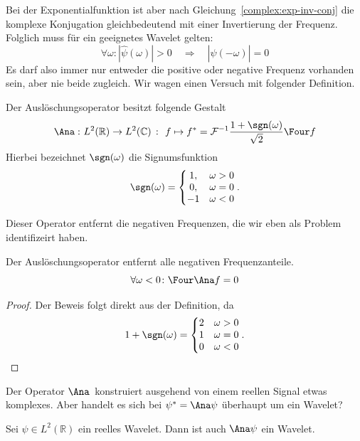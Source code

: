 Bei der Exponentialfunktion ist aber nach Gleichung~\ref{complex:exp-inv-conj} die komplexe Konjugation gleichbedeutend mit einer Invertierung der Frequenz.
Folglich muss für ein geeignetes Wavelet gelten:
\[
	\forall \omega \colon |\hat\psi(\omega)| > 0 
	\quad\Rightarrow\quad
	|\hat\psi(-\omega)| = 0 
\]
Es darf also immer nur entweder die positive oder negative Frequenz vorhanden sein, aber nie beide zugleich.
Wir wagen einen Versuch mit folgender Definition.
\begin{definition}
	Der Auslöschungsoperator besitzt folgende Gestalt
		\[\Ana\, \colon L^2(\mathbb R) \to L^2(\mathbb C)
		~\colon~
		f \mapsto f^\ast = \mathcal{F}^{-1}\frac{1+\sgn(\omega)}{\sqrt 2}\Four f\]
	Hierbei bezeichnet $\sgn(\omega)$ die Signumsfunktion
	\[\sgn(\omega) = \left\lbrace\begin{matrix} 1, & \omega > 0 \\ 0, &\omega = 0 \\ -1 & \omega < 0 \end{matrix}\right..\]
\end{definition}
Dieser Operator entfernt die negativen Frequenzen, die wir eben als Problem identifizeirt haben.
\begin{lemma}
	Der Auslöschungsoperator entfernt alle negativen Frequenzanteile.
	\[\forall \omega < 0 \colon \Four\Ana f = 0\]
\end{lemma}
\begin{proof}
	Der Beweis folgt direkt aus der Definition, da
	\[
		1+\sgn(\omega) = 
		\left\lbrace\begin{matrix}
		2 & \omega > 0\\
		1 & \omega = 0\\
		0 & \omega < 0
		\end{matrix}\right..\qedhere
	\]
\end{proof}
Der Operator $\Ana\,$ konstruiert ausgehend von einem reellen Signal etwas komplexes.
Aber handelt es sich bei $\psi^\ast = \Ana\psi$ überhaupt um ein Wavelet?

\begin{satz}
	Sei $\psi \in L^2(\mathbb R)$ ein reelles Wavelet.
	Dann ist auch $\Ana\psi$ ein Wavelet.
\end{satz}

